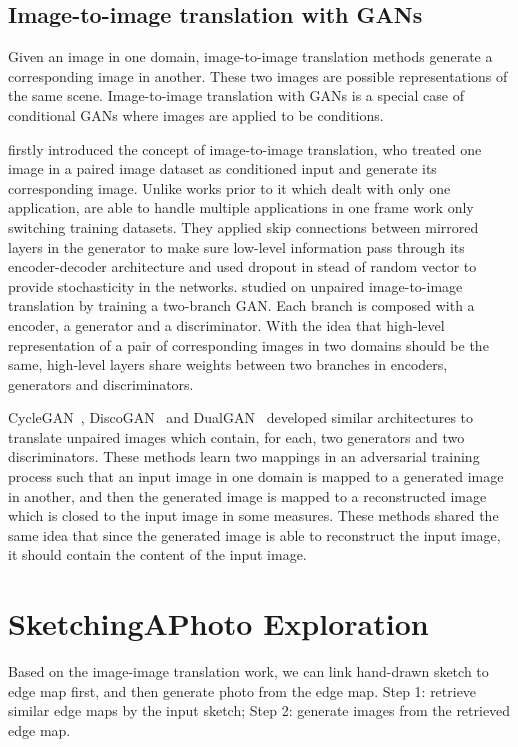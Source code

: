\subsection{Image-to-image translation with GANs}
Given an image in one domain, image-to-image translation methods generate a corresponding image in another. These two images are possible representations of the same scene. Image-to-image translation with GANs is a special case of conditional GANs where images are applied to be conditions. 
%

\cite{pix2pix} firstly introduced the concept of image-to-image translation, who treated one image in a paired image dataset as conditioned input and generate its corresponding image. Unlike works prior to it which dealt with only one application, \cite{pix2pix} are able to handle multiple applications in one frame work only switching training datasets. They applied skip connections between mirrored layers in the generator to make sure low-level information pass through its encoder-decoder architecture and used dropout in stead of random vector to provide stochasticity in the networks.
%
\cite{UNIT} studied on unpaired image-to-image translation by training a two-branch GAN. Each branch is composed with a encoder, a generator and a discriminator. With the idea that high-level representation of a pair of corresponding images in two domains should be the same, high-level layers share weights between two branches in encoders, generators and discriminators. 
%

CycleGAN~\cite{CycleGAN}, DiscoGAN~\cite{DiscoGAN} and DualGAN~\cite{DualGAN} developed similar architectures to translate unpaired images which contain, for each, two generators and two discriminators. These methods learn two mappings in an adversarial training process such that an input image in one domain is mapped to a generated image in another, and then the generated image is mapped to a reconstructed image which is closed to the input image in some measures. These methods shared the same idea that since the generated image is able to reconstruct the input image, it should contain the content of the input image.

\section{SketchingAPhoto Exploration}
Based on the image-image translation work, we can link hand-drawn sketch to edge map first, and then generate photo from the edge map. Step 1: retrieve similar edge maps by the input sketch; Step 2: generate images from the retrieved edge map.
